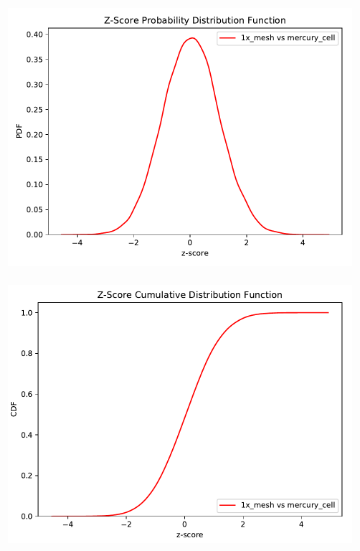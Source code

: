 \begin{figure}
	\begin{subfigure}[h]{0.5\textwidth}
		\includegraphics[width=\linewidth, trim={0cm 0cm 0cm 0.9cm},clip]{../figs/toy_p1/PDF_zscore_VPI_1x_orig.pdf}
		\label{fig:1pdf_1x_orig}
	\end{subfigure}\hfill
	\begin{subfigure}[h]{0.5\textwidth}
		\includegraphics[width=\linewidth, trim={0cm 0cm 0cm 0.8cm},clip]{../figs/toy_p1/CDF_zscore_VPI_1x_orig.pdf}
		\label{fig:1cdf_1x_orig}
	\end{subfigure}


\end{figure}
